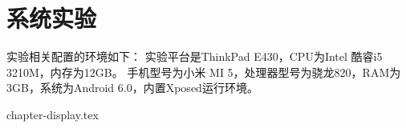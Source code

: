 \chapter{系统实验}  
\label{chp:testing}


实验相关配置的环境如下：
实验平台是ThinkPad E430，CPU为Intel 酷睿i5 3210M，内存为12GB。
手机型号为小米 MI 5，处理器型号为骁龙820，RAM为3GB，系统为Android 6.0，内置Xposed运行环境。



 {chapter-display.tex}
